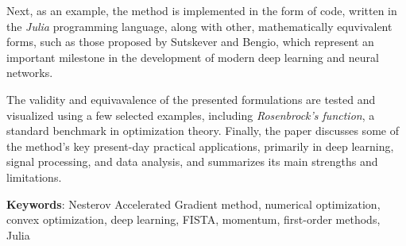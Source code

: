 \noindent Next, as an example, the method is implemented in the form of code, written in the \textit{Julia} programming language, along with other, mathematically equvivalent forms,
such as those proposed by Sutskever and Bengio, which represent an important milestone in the development of modern deep learning and neural networks.

\noindent The validity and equivavalence of the presented formulations are tested and visualized using a few selected examples, including \textit{Rosenbrock's function}, a standard benchmark in optimization theory.
Finally, the paper discusses some of the method's key present-day practical applications, primarily in deep learning, signal processing, and data analysis, and summarizes its main strengths and limitations.

\vspace{1cm}
\textbf{Keywords}: Nesterov Accelerated Gradient method, numerical optimization, convex optimization, deep learning, FISTA, momentum, first-order methods, Julia

